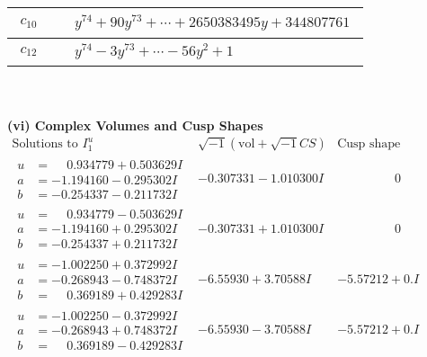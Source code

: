 \documentclass[1p]{elsarticle_modified}
\theoremstyle{definition}
\newcommand{\I}{\sqrt{-1}}
\begin{document}
\begin{tabular}{m{50pt}|m{274pt}}
\hline $$\begin{aligned}c_{10}\end{aligned}$$&$\begin{aligned}
&y^{74}+90 y^{73}+\cdots+2650383495 y+344807761
\end{aligned}$\\
\hline $$\begin{aligned}c_{12}\end{aligned}$$&$\begin{aligned}
&y^{74}-3 y^{73}+\cdots-56 y^2+1
\end{aligned}$\\
\hline
\end{tabular}\\~\\
\newpage\flushleft \textbf{(vi) Complex Volumes and Cusp Shapes}
$$\begin{array}{c|c|c}  
\text{Solutions to }I^u_{1}& \I (\text{vol} + \sqrt{-1}CS) & \text{Cusp shape}\\
 \hline 
\begin{aligned}
u &= \phantom{-}0.934779 + 0.503629 I \\
a &= -1.194160 - 0.295302 I \\
b &= -0.254337 - 0.211732 I\end{aligned}
 & -0.307331 - 1.010300 I & \phantom{-0.000000 } 0 \\ \hline\begin{aligned}
u &= \phantom{-}0.934779 - 0.503629 I \\
a &= -1.194160 + 0.295302 I \\
b &= -0.254337 + 0.211732 I\end{aligned}
 & -0.307331 + 1.010300 I & \phantom{-0.000000 } 0 \\ \hline\begin{aligned}
u &= -1.002250 + 0.372992 I \\
a &= -0.268943 - 0.748372 I \\
b &= \phantom{-}0.369189 + 0.429283 I\end{aligned}
 & -6.55930 + 3.70588 I & -5.57212 + 0. I\phantom{ +0.000000I} \\ \hline\begin{aligned}
u &= -1.002250 - 0.372992 I \\
a &= -0.268943 + 0.748372 I \\
b &= \phantom{-}0.369189 - 0.429283 I\end{aligned}
 & -6.55930 - 3.70588 I & -5.57212 + 0. I\phantom{ +0.000000I} \\ \hline\begin{aligned}

\end{aligned}
\end{array}$$
\end{document}
